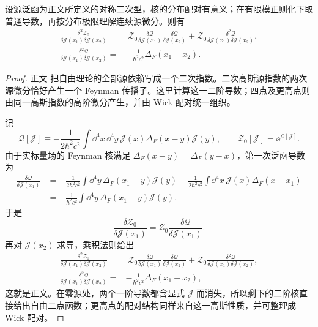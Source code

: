 


\begin{proposition}[二次高斯源指数的二阶微分]
设源泛函为正文所定义的对称二次型，核的分布配对有意义；在有限模正则化下取普通导数，再按分布极限理解连续源微分。则有
\begin{align}
 \frac{\delta^2\mathcal Z_0}
 {\delta\mathcal J(x_1)\delta\mathcal J(x_2)}
 =&\;\mathcal Z_0
 \frac{\delta\mathscr Q}{\delta\mathcal J(x_1)}
 \frac{\delta\mathscr Q}{\delta\mathcal J(x_2)}
 +\mathcal Z_0
 \frac{\delta^2\mathscr Q}
 {\delta\mathcal J(x_1)\delta\mathcal J(x_2)},\\
 \frac{\delta^2\mathscr Q}
 {\delta\mathcal J(x_1)\delta\mathcal J(x_2)}
 =&-\frac{1}{\hbar^2c^2}\Delta_F(x_1-x_2).
\label{eq:qft-QJ-second-derivative-dp6}
\end{align}
\end{proposition}
\begin{proof}
正文 把自由理论的全部源依赖写成一个二次指数。二次高斯源指数的两次源微分恰好产生一个 Feynman 传播子。这里计算这一二阶导数；四点及更高点则由同一高斯指数的高阶微分产生，并由 Wick 配对统一组织。

记
\begin{equation*}
 \mathscr Q[\mathcal J]
 \equiv
 -\frac{1}{2\hbar^2c^2}
 \int\dd^4 x\,\dd^4 y\,
 \mathcal J(x)\Delta_F(x-y)\mathcal J(y),
 \qquad
 \mathcal Z_0[\mathcal J]=\ee^{\mathscr Q[\mathcal J]}.
\end{equation*}
由于实标量场的 Feynman 核满足
$\Delta_F(x-y)=\Delta_F(y-x)$，第一次泛函导数为
\begin{align*}
 \frac{\delta\mathscr Q}{\delta\mathcal J(x_1)}
 &=-\frac{1}{2\hbar^2c^2}
 \int\dd^4 y\,\Delta_F(x_1-y)\mathcal J(y)
 -\frac{1}{2\hbar^2c^2}
 \int\dd^4 x\,\mathcal J(x)\Delta_F(x-x_1)\\
 &=-\frac{1}{\hbar^2c^2}
 \int\dd^4 y\,\Delta_F(x_1-y)\mathcal J(y).
\end{align*}
于是
\begin{equation*}
 \frac{\delta\mathcal Z_0}{\delta\mathcal J(x_1)}
 =\mathcal Z_0
 \frac{\delta\mathscr Q}{\delta\mathcal J(x_1)}.
\end{equation*}
再对 $\mathcal J(x_2)$ 求导，乘积法则给出
\begin{align*}
 \frac{\delta^2\mathcal Z_0}
 {\delta\mathcal J(x_1)\delta\mathcal J(x_2)}
 =&\;\mathcal Z_0
 \frac{\delta\mathscr Q}{\delta\mathcal J(x_1)}
 \frac{\delta\mathscr Q}{\delta\mathcal J(x_2)}
 +\mathcal Z_0
 \frac{\delta^2\mathscr Q}
 {\delta\mathcal J(x_1)\delta\mathcal J(x_2)},\\
 \frac{\delta^2\mathscr Q}
 {\delta\mathcal J(x_1)\delta\mathcal J(x_2)}
 =&-\frac{1}{\hbar^2c^2}\Delta_F(x_1-x_2),
\end{align*}
这就是正文。在零源处，两个一阶导数都含显式 $\mathcal J$ 而消失，所以剩下的二阶核直接给出自由二点函数；更高点的配对结构同样来自这一高斯性质，并可整理成 Wick 配对。
\end{proof}


